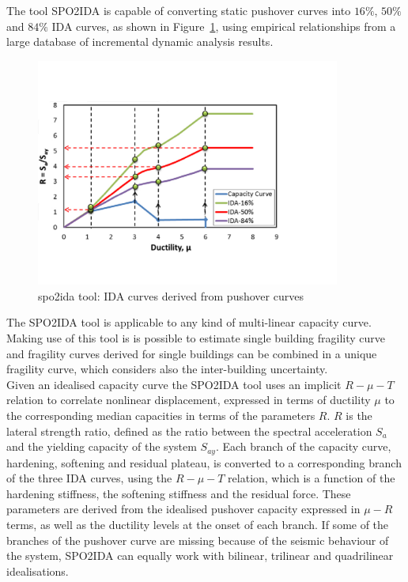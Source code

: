 The tool SPO2IDA \citep{VamvatsikosCornell2005} is capable of converting static pushover curves into $16\%$, $50\%$ and $84\%$ IDA curves, as shown in Figure~\ref{fig:spo2ida}, using empirical relationships from a large database of incremental dynamic analysis results.

\begin{figure}[!htbp]
\centering
\includegraphics[width=10cm]{figures/spo2ida.jpg}
\caption{spo2ida tool: IDA curves derived from pushover curves}
\label{fig:spo2ida}
\end{figure}

The SPO2IDA tool is applicable to any kind of multi-linear capacity curve. Making use of this tool is is possible to estimate single building fragility curve and fragility curves derived for single buildings can be combined in a unique fragility curve, which considers also the inter-building uncertainty.\\

Given an idealised capacity curve the SPO2IDA tool uses an implicit $R-\mu-T$ relation to correlate nonlinear displacement, expressed in terms of ductility $\mu$ to the corresponding median capacities in terms of the parameters $R$. $R$ is the lateral strength ratio, defined as the ratio between the spectral acceleration $S_a$ and the yielding capacity of the system $S_{ay}$. Each branch of the capacity curve, hardening, softening and residual plateau, is converted to a corresponding branch of the three IDA curves, using the $R-\mu-T$ relation, which is a function of the hardening stiffness, the softening stiffness and the residual force. These parameters are derived from the idealised pushover capacity expressed in $\mu-R$ terms, as well as the ductility levels at the onset of each branch. If some of the branches of the pushover curve are missing because of the seismic behaviour of the system, SPO2IDA can equally work with bilinear, trilinear and quadrilinear idealisations.\\

